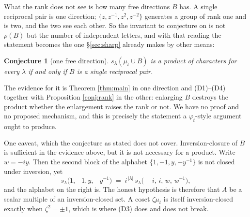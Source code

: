 \documentclass[11pt,reqno]{amsart}
\theoremstyle{plain}
\newtheorem{conjecture}[theorem]{Conjecture}
\theoremstyle{definition}
\newcommand{\zt}{\mu_t}
\begin{document}
What the rank does not see is how many free directions $B$ has. A single reciprocal pair is one
direction; $\{z,z^{-1},z^{2},z^{-2}\}$ generates a group of rank one and is two, and the two see each
other. So the invariant to conjecture on is not $\rho(B)$ but the number of independent letters,
and with that reading the statement becomes the one \S\ref{sec:sharp} already makes by other means:

\begin{conjecture}[one free direction]\label{conj:rank2}
$s_\lambda(\zt\cup B)$ is a product of characters for every $\lambda$ if and only if $B$ is a single
reciprocal pair.
\end{conjecture}

The evidence for it is Theorem \ref{thm:main} in one direction and (D1)--(D4) together with
Proposition \ref{conj:rank} in the other: enlarging $B$ destroys the product whether the enlargement
raises the rank or not. We have no proof and no proposed mechanism, and this is precisely the
statement a $\varphi_t$-style argument ought to produce.

One caveat, which the conjecture as stated does not cover. Inversion-closure of $B$ is sufficient in
the evidence above, but it is not necessary for a product. Write $w=-iy$. Then the second block of
the alphabet $\{1,-1,y,-y^{-1}\}$ is not closed under inversion, yet
\begin{equation}\label{eq:scalar}
s_\lambda\big(1,-1,y,-y^{-1}\big)\;=\;i^{\,|\lambda|}\,s_\lambda\big(-i,\,i,\,w,\,w^{-1}\big),
\end{equation}
and the alphabet on the right is. The honest hypothesis is therefore that $A$ be a scalar multiple of
an inversion-closed set. A coset $\zeta\zt$ is itself inversion-closed exactly when
$\zeta^{2}=\pm1$, which is where (D3) does and does not break.
\end{document}
